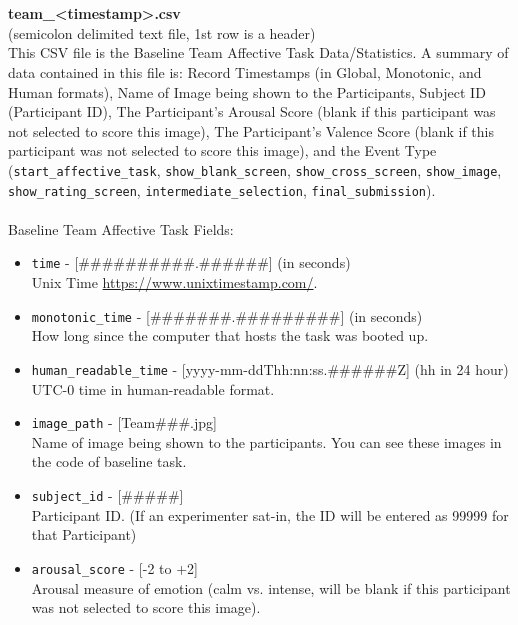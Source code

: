 \begin{description}
\begin{addmargin}[0em]{0em}
        \textbf{\\\\}
        \begin{addmargin}[1em]{0em} %
            \textbf{team\_<timestamp>.csv}\\(semicolon delimited text file, 1st row is a header)\\
            This CSV file is the Baseline Team Affective Task Data/Statistics. A summary of data contained in this file is: Record Timestamps (in Global, Monotonic, and Human formats), Name of Image being shown to the Participants, Subject ID (Participant ID), The Participant's Arousal Score (blank if this participant was not selected to score this image), The Participant's Valence Score (blank if this participant was not selected to score this image), and the Event Type
            (\verb|start_affective_task|, \verb|show_blank_screen|,
            \verb|show_cross_screen|, \verb|show_image|, \verb|show_rating_screen|,
            \verb|intermediate_selection|, \verb|final_submission|).\\\\
            Baseline Team Affective Task Fields:
            \begin{itemize}
                \item \verb|time| - [\#\#\#\#\#\#\#\#\#\#.\#\#\#\#\#\#] (in seconds)\\Unix Time \href{https://www.unixtimestamp.com/}{https://www.unixtimestamp.com/}.
                \item \verb|monotonic_time| - [\#\#\#\#\#\#\#.\#\#\#\#\#\#\#\#\#] (in seconds)\\How long since the computer that hosts the task was booted up.
                \item \verb|human_readable_time| - [yyyy-mm-ddThh:nn:ss.\#\#\#\#\#\#Z] (hh in 24 hour)\\ UTC-0 time in human-readable format.
                \item \verb|image_path| - [Team\#\#\#.jpg]\\Name of image being shown to the participants. You can see these images in the code of baseline task.
                \item \verb|subject_id| - [\#\#\#\#\#]\\Participant ID. (If an experimenter sat-in, the ID will be entered as 99999 for that Participant)
                \item \verb|arousal_score| - [-2 to +2]\\Arousal measure of emotion (calm vs. intense, will be blank if this participant was not selected to score this image).

\end{itemize}
\end{addmargin}
\end{addmargin}
\end{description}
